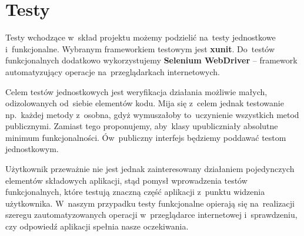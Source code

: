 \documentclass{article}
\begin{document}
\section{Testy}

Testy wchodzące w~skład projektu możemy podzielić na~testy jednostkowe i~funkcjonalne. Wybranym frameworkiem testowym jest \textbf{xunit}. Do~testów funkcjonalnych dodatkowo wykorzystujemy \textbf{Selenium WebDriver} -- framework automatyzujący operacje na~przeglądarkach internetowych.

Celem testów jednostkowych jest weryfikacja działania możliwie małych, odizolowanych od~siebie elementów kodu. Mija się z~celem jednak testowanie np.~każdej metody z~osobna, gdyż wymuszałoby to~uczynienie wszystkich metod publicznymi. Zamiast tego proponujemy, aby~klasy upubliczniały absolutne minimum funkcjonalności. Ów~publiczny interfejs będziemy poddawać testom jednostkowym.

Użytkownik przeważnie nie jest jednak zainteresowany działaniem pojedynczych elementów składowych aplikacji, stąd pomysł wprowadzenia testów funkcjonalnych, które testują znaczną część aplikacji z~punktu widzenia użytkownika. W~naszym przypadku testy funkcjonalne opierają się na~realizacji szeregu zautomatyzowanych operacji w~przeglądarce internetowej i~sprawdzeniu, czy odpowiedź aplikacji spełnia nasze oczekiwania.
\end{document}
